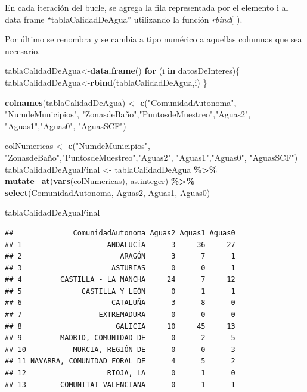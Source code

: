 \documentclass[
]{article}
\newenvironment{Shaded}{\begin{snugshade}}{\end{snugshade}}
\newcommand{\ControlFlowTok}[1]{\textcolor[rgb]{0.13,0.29,0.53}{\textbf{#1}}}
\newcommand{\FunctionTok}[1]{\textcolor[rgb]{0.13,0.29,0.53}{\textbf{#1}}}
\newcommand{\NormalTok}[1]{#1}
\newcommand{\OtherTok}[1]{\textcolor[rgb]{0.56,0.35,0.01}{#1}}
\newcommand{\SpecialCharTok}[1]{\textcolor[rgb]{0.81,0.36,0.00}{\textbf{#1}}}
\newcommand{\StringTok}[1]{\textcolor[rgb]{0.31,0.60,0.02}{#1}}
\begin{document}
En cada iteración del bucle, se agrega la fila representada por el
elemento i al data frame ``tablaCalidadDeAgua'' utilizando la función
\emph{rbind}( ).

Por último se renombra y se cambia a tipo numérico a aquellas columnas
que sea necesario.

\begin{Shaded}
\begin{Highlighting}[]
\NormalTok{tablaCalidadDeAgua}\OtherTok{\textless{}{-}}\FunctionTok{data.frame}\NormalTok{()}
\ControlFlowTok{for}\NormalTok{ (i }\ControlFlowTok{in}\NormalTok{ datosDeInteres)\{}
\NormalTok{  tablaCalidadDeAgua}\OtherTok{\textless{}{-}}\FunctionTok{rbind}\NormalTok{(tablaCalidadDeAgua,i)}
\NormalTok{\}}

\FunctionTok{colnames}\NormalTok{(tablaCalidadDeAgua) }\OtherTok{\textless{}{-}} \FunctionTok{c}\NormalTok{(}\StringTok{"ComunidadAutonoma"}\NormalTok{, }\StringTok{"NumdeMunicipios"}\NormalTok{, }\StringTok{"ZonasdeBaño"}\NormalTok{,}\StringTok{"PuntosdeMuestreo"}\NormalTok{,}\StringTok{"Aguas2"}\NormalTok{, }\StringTok{"Aguas1"}\NormalTok{,}\StringTok{"Aguas0"}\NormalTok{, }\StringTok{"AguasSCF"}\NormalTok{)}

\NormalTok{colNumericas }\OtherTok{\textless{}{-}} \FunctionTok{c}\NormalTok{(}\StringTok{"NumdeMunicipios"}\NormalTok{, }\StringTok{"ZonasdeBaño"}\NormalTok{,}\StringTok{"PuntosdeMuestreo"}\NormalTok{,}\StringTok{"Aguas2"}\NormalTok{, }\StringTok{"Aguas1"}\NormalTok{,}\StringTok{"Aguas0"}\NormalTok{, }\StringTok{"AguasSCF"}\NormalTok{)}
\NormalTok{tablaCalidadDeAguaFinal }\OtherTok{\textless{}{-}}\NormalTok{ tablaCalidadDeAgua }\SpecialCharTok{\%\textgreater{}\%}
  \FunctionTok{mutate\_at}\NormalTok{(}\FunctionTok{vars}\NormalTok{(colNumericas), as.integer) }\SpecialCharTok{\%\textgreater{}\%}
  \FunctionTok{select}\NormalTok{(ComunidadAutonoma, Aguas2, Aguas1, Aguas0)}
\end{Highlighting}
\end{Shaded}

\hypertarget{VariableAgua}{}

\begin{Shaded}
\begin{Highlighting}[]
\NormalTok{tablaCalidadDeAguaFinal}
\end{Highlighting}
\end{Shaded}

\begin{verbatim}
##              ComunidadAutonoma Aguas2 Aguas1 Aguas0
## 1                    ANDALUCÍA      3     36     27
## 2                       ARAGÓN      3      7      1
## 3                     ASTURIAS      0      0      1
## 4         CASTILLA - LA MANCHA     24      7     12
## 5              CASTILLA Y LEÓN      0      1      1
## 6                     CATALUÑA      3      8      0
## 7                  EXTREMADURA      0      0      0
## 8                      GALICIA     10     45     13
## 9         MADRID, COMUNIDAD DE      0      2      5
## 10           MURCIA, REGIÓN DE      0      0      3
## 11 NAVARRA, COMUNIDAD FORAL DE      4      5      2
## 12                   RIOJA, LA      0      1      0
## 13        COMUNITAT VALENCIANA      0      1      1
\end{verbatim}
\end{document}
